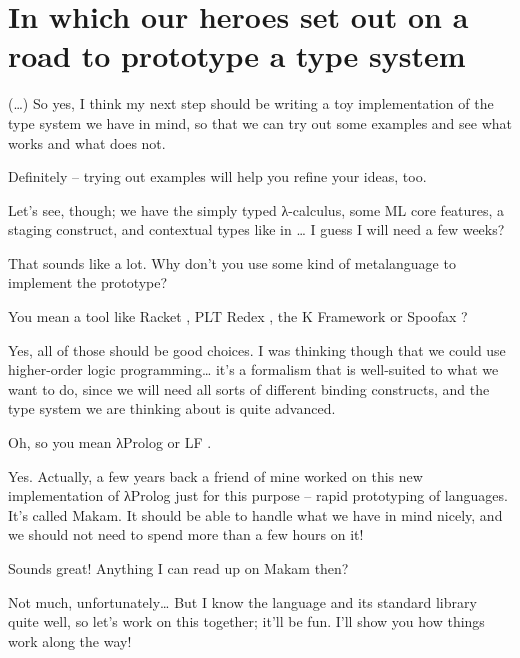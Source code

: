 \section{In which our heroes set out on a road to prototype a type
system}\label{in-which-our-heroes-set-out-on-a-road-to-prototype-a-type-system}

 (\ldots{}) So yes, I think my next step should be
writing a toy implementation of the type system we have in mind, so that
we can try out some examples and see what works and what does not.

 Definitely -- trying out examples will help you
refine your ideas, too.

\heroSTUDENT{} Let's see, though; we have the simply typed \foreignlanguage{greek}{λ}-calculus, some ML
core features, a staging construct, and contextual types like in
\citet{nanevski2008contextual}\ldots{} I guess I will need a few weeks?

\heroADVISOR{} That sounds like a lot. Why don't you use some kind of
metalanguage to implement the prototype?

\heroSTUDENT{} You mean a tool like Racket \citep{racket-manifesto}, PLT Redex
\citep{felleisen2009semantics}, the K Framework
\citep{k-framework-main-reference} or Spoofax
\citep{spoofax-main-reference}?

\heroADVISOR{} Yes, all of those should be good choices. I was thinking though
that we could use higher-order logic programming\ldots{} it's a
formalism that is well-suited to what we want to do, since we will need
all sorts of different binding constructs, and the type system we are
thinking about is quite advanced.

\heroSTUDENT{} Oh, so you mean \foreignlanguage{greek}{λ}Prolog \citep{miller1988overview} or LF
\citep{lf-main-reference}.

\heroADVISOR{} Yes. Actually, a few years back a friend of mine worked on this
new implementation of \foreignlanguage{greek}{λ}Prolog just for this purpose -- rapid prototyping
of languages. It's called Makam. It should be able to handle what we
have in mind nicely, and we should not need to spend more than a few
hours on it!

\heroSTUDENT{} Sounds great! Anything I can read up on Makam then?

\heroADVISOR{} Not much, unfortunately\ldots{} But I know the language and its
standard library quite well, so let's work on this together; it'll be
fun. I'll show you how things work along the way!

